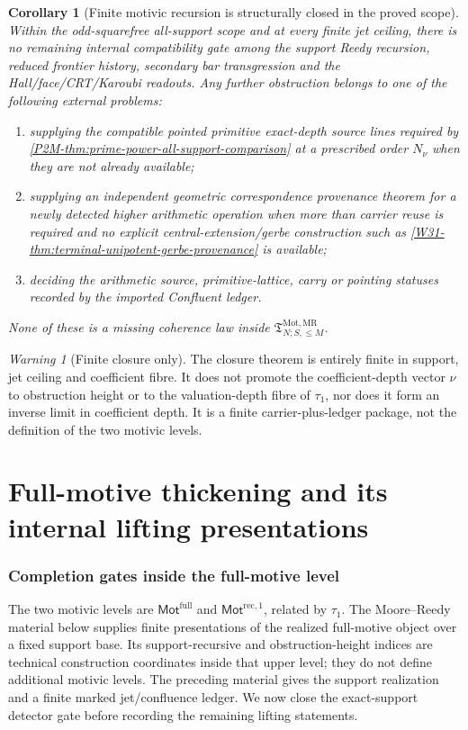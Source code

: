 \documentclass[11pt]{article}
\newtheorem{corollary}[theorem]{Corollary}
\theoremstyle{remark}
\newtheorem{warning}[theorem]{Warning}
\newcommand{\Mot}{\mathrm{Mot}}
\newcommand{\MR}{\mathrm{MR}}
\providecommand{\RecOneMot}{\mathsf{Mot}^{\mathrm{rec},1}}
\providecommand{\FullMot}{\mathsf{Mot}^{\mathrm{full}}}
\providecommand{\tauone}{\tau_{1}}
\begin{document}
\begin{corollary}[Finite motivic recursion is structurally closed in the proved scope]
\label{P2M-cor:v38-finite-recursion-structurally-closed}
Within the odd-squarefree all-support scope and at every finite jet ceiling,
there is no remaining internal compatibility gate among the support Reedy
recursion, reduced frontier history, secondary bar transgression and the
Hall/face/CRT/Karoubi readouts.  Any further obstruction belongs to one of the
following external problems:
\begin{enumerate}[label=\textup{(\alph*)}]
\item supplying the compatible pointed primitive exact-depth source lines required by \cref{P2M-thm:prime-power-all-support-comparison} at a prescribed order $N_\nu$ when they are not already available;
\item supplying an independent geometric correspondence provenance theorem for
a newly detected higher arithmetic operation when more than carrier reuse is
required and no explicit central-extension/gerbe construction such as
\cref{W31-thm:terminal-unipotent-gerbe-provenance} is available;
\item deciding the arithmetic source, primitive-lattice, carry or pointing
statuses recorded by the imported Confluent ledger.
\end{enumerate}
None of these is a missing coherence law inside
$\mathfrak T^{\Mot,\MR}_{N;S,\le M}$.
\end{corollary}

\begin{warning}[Finite closure only]
\label{P2M-warn:v38-finite-not-motivic-adelic}
The closure theorem is entirely finite in support, jet ceiling and coefficient fibre.
It does not promote the coefficient-depth vector $\nu$ to obstruction height or to the
valuation-depth fibre of \(\tauone\), nor does it form an inverse limit in coefficient
depth.  It is a finite carrier-plus-ledger package, not the definition of the two
motivic levels.
\end{warning}


\part{Full-motive thickening and its internal lifting presentations}
\section{Completion gates inside the full-motive level}\label{sec:full-tower-gaps}
The two motivic levels are \(\FullMot\) and \(\RecOneMot\), related by
\(\tauone\).  The Moore--Reedy material below supplies finite presentations of the
realized full-motive object over a fixed support base.  Its support-recursive and
obstruction-height indices are technical construction coordinates inside that upper
level; they do not define additional motivic levels.  The preceding material gives the
support realization and a finite marked jet/confluence ledger.  We now close the
exact-support detector gate before recording the remaining lifting statements.
\end{document}
